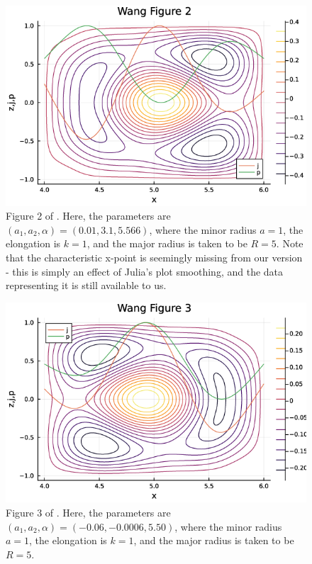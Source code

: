 \begin{figure}[h!]
    \centering
    \includegraphics[scale=0.6]{imgs/c3/wang-fig-2.png}
    \caption{Figure 2 of \cite{wang-analytic-solution}. Here, the parameters are $(a_1, a_2, \alpha) = (0.01, 3.1, 5.566)$, 
    where the minor radius $a = 1$, the elongation is $k = 1$, and the major radius is taken to be $R = 5$. Note that 
    the characteristic x-point is seemingly missing from our version - this is simply an effect of Julia's plot 
    smoothing, and the data representing it is still available to us.}
\end{figure}

\begin{figure}[h!]
    \centering
    \includegraphics[scale=0.6]{imgs/c3/wang-fig-3.png}
    \caption{Figure 3 of \cite{wang-analytic-solution}. Here, the parameters are $(a_1, a_2, \alpha) = (-0.06, -0.0006, 5.50)$, 
    where the minor radius $a = 1$, the elongation is $k = 1$, and the major radius is taken to be $R = 5$.}
\end{figure}

